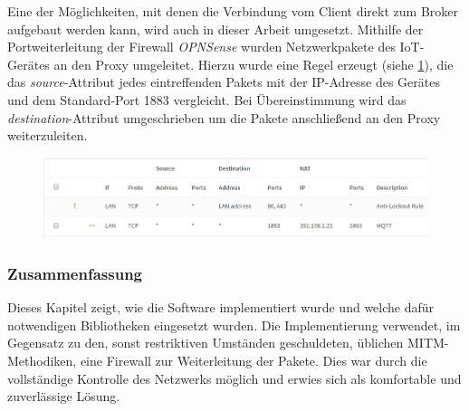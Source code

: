     Eine der Möglichkeiten, mit denen die Verbindung vom Client direkt zum Broker aufgebaut werden kann, wird auch in dieser Arbeit umgesetzt.
    Mithilfe der Portweiterleitung der Firewall \emph{OPNSense} wurden Netzwerkpakete des \ac{IoT}-Gerätes an den Proxy umgeleitet. Hierzu wurde eine Regel erzeugt (siehe \ref{fig:firewall_rule}), die das \emph{source}-Attribut jedes eintreffenden Pakets mit der IP-Adresse des Gerätes und dem Standard-Port 1883 vergleicht. Bei Übereinstimmung wird das \emph{destination}-Attribut umgeschrieben um die Pakete anschließend an den Proxy weiterzuleiten.
    \begin{figure}[h]%
        \centering
        \includegraphics[width=14cm]{tex/bilder/5_implementierung/firewall.PNG}
        \label{fig:firewall_rule}
    \end{figure}
    
\subsubsection{Zusammenfassung}
    Dieses Kapitel zeigt, wie die Software implementiert wurde und welche dafür notwendigen Bibliotheken eingesetzt wurden. Die Implementierung verwendet, im Gegensatz zu den, sonst restriktiven Umständen geschuldeten, üblichen \ac{MITM}-Methodiken, eine Firewall zur Weiterleitung der Pakete. Dies war durch die vollständige Kontrolle des Netzwerks möglich und erwies sich als komfortable und zuverlässige Lösung.